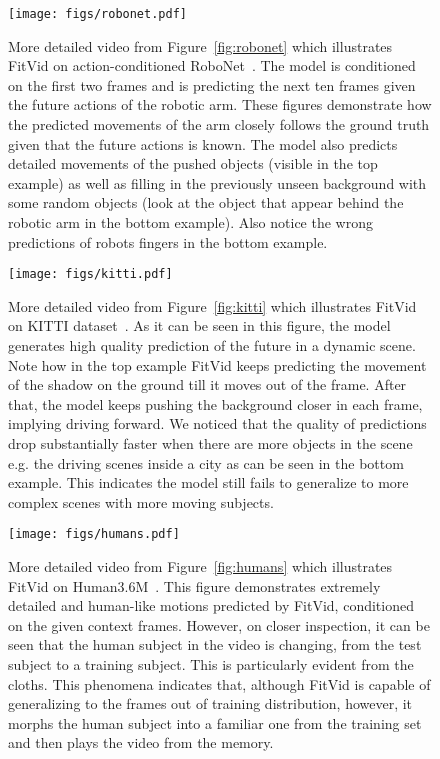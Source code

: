 \documentclass{article}
\newcommand{\model}{FitVid\xspace}
\begin{document}
\begin{landscape}
    \begin{figure}
        \texttt{[image: figs/robonet.pdf]}
        \caption{More detailed video from Figure~\ref{fig:robonet} which illustrates \model on action-conditioned RoboNet~\cite{dasari2019robonet}. The model is conditioned on the first two frames and is predicting the next ten frames given the future actions of the robotic arm. These figures demonstrate how the predicted movements of the arm closely follows the ground truth given that the future actions is known. The model also predicts detailed movements of the pushed objects (visible in the top example) as well as filling in the previously unseen background with some random objects (look at the object that appear behind the robotic arm in the bottom example). Also notice the wrong predictions of robots fingers in the bottom example. }
        \label{fig:robonet_full}
    \end{figure}
    
    \begin{figure}
        \texttt{[image: figs/kitti.pdf]}
        \caption{More detailed video from Figure~\ref{fig:kitti} which illustrates \model on KITTI dataset~\cite{geiger2013vision}. As it can be seen in this figure, the model generates high quality prediction of the future in a dynamic scene. Note how in the top example \model keeps predicting the movement of the shadow on the ground till it moves out of the frame. After that, the model keeps pushing the background closer in each frame, implying driving forward. We noticed that the quality of predictions drop substantially faster when there are more objects in the scene e.g. the driving scenes inside a city as can be seen in the bottom example. This indicates the model still fails to generalize to more complex scenes with more moving subjects.}
        \label{fig:kitti_full}
    \end{figure}
    
    \begin{figure}
        \texttt{[image: figs/humans.pdf]}
        \caption{More detailed video from Figure~\ref{fig:humans} which illustrates \model on Human3.6M~\cite{ionescu2014human3}. This figure demonstrates extremely detailed and human-like motions predicted by \model, conditioned on the given context frames. However, on closer inspection, it can be seen that the human subject in the video is changing, from the test subject to a training subject. This is particularly evident from the cloths. This phenomena indicates that, although \model is capable of generalizing to the frames out of training distribution, however, it morphs the human subject into a familiar one from the training set and then plays the video from the memory.}
        \label{fig:humans_full}
    \end{figure}
    

\end{landscape}
\end{document}

